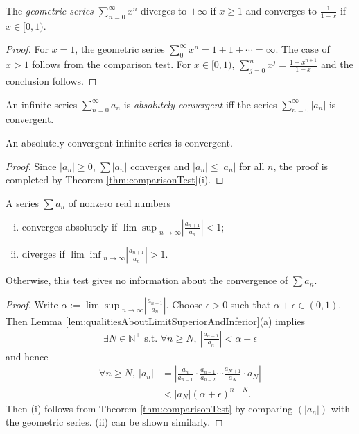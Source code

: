 \begin{thm}
  \label{thm:geometricSeries}
  The \emph{geometric series} $\sum_{n=0}^{\infty} x^n$
  diverges to $+\infty$ if $x\ge 1$
  and converges to $\frac{1}{1-x}$ if $x\in [0,1)$.
\end{thm}
\begin{proof}
  For $x=1$, the geometric series
  $\sum_0^{\infty} x^n = 1 + 1+\cdots = \infty$.
  The case of $x>1$ follows from the comparison test.
  For $x\in[0,1)$,
  $\sum_{j=0}^{n} x^j = \frac{1-x^{n+1}}{1-x}$
  and the conclusion follows.
\end{proof}

\begin{defn}
  \label{def:absoluteConvergence}
  An infinite series $\sum_{n=0}^{\infty} a_n$
  is \emph{absolutely convergent}
  iff the series $\sum_{n=0}^{\infty} |a_n|$ is convergent.
\end{defn}

\begin{lem}
  \label{lem:absolutelyConvergenceSeriesConverge}
  An absolutely convergent infinite series is convergent.
\end{lem}
\begin{proof}
  Since $|a_{n}|\ge 0$,  $\sum |a_{n}|$ converges and
  $|a_{n}|\le |a_{n}|$ for all $n$, the proof is completed by
  Theorem \ref{thm:comparisonTest}(i).
\end{proof}

\begin{thm}
  \label{thm:ratioTest}
  A series $\sum a_n$ of nonzero real numbers 
  \begin{enumerate}[(i)]\itemsep0em
  \item converges absolutely if
    ${\lim\sup}_{n\rightarrow\infty}|\frac{a_{n+1}}{a_n}|<1$;
  \item diverges if ${\lim\inf}_{n\rightarrow\infty}|\frac{a_{n+1}}{a_n}|>1$. 
  \end{enumerate}
  Otherwise, this test gives no information
  about the convergence of $\sum a_n$.
\end{thm}
\begin{proof}
  Write $\alpha:={\lim\sup}_{n\rightarrow\infty}|\frac{a_{n+1}}{a_n}|$.
  Choose $\epsilon>0$ such that $\alpha+\epsilon\in(0,1)$.
  Then Lemma \ref{lem:qualitiesAboutLimitSuperiorAndInferior}(a) implies
  \begin{displaymath}
    \begin{array}{l}
    \exists N\in \mathbb{N}^{+} \text{ s.t. }
    \forall n\ge N,\ 
    \left|\frac{a_{n+1}}{a_{n}}\right|<\alpha+\epsilon
    \end{array}
  \end{displaymath}
  and hence
  \begin{align*}
    \forall n\ge N,\ 
    |a_{n}|&=\left|\frac{a_{n}}{a_{n-1}}\cdot \frac{a_{n-1}}{a_{n-2}}
     \cdots \frac{a_{N+1}}{a_{N}}\cdot a_{N}  \right|\\
    &<|a_{N}|(\alpha+\epsilon)^{n-N}.
  \end{align*}
  Then (i) follows from Theorem \ref{thm:comparisonTest}
  by comparing $(|a_n|)$ with the geometric series.
  (ii) can be shown similarly.
\end{proof}

